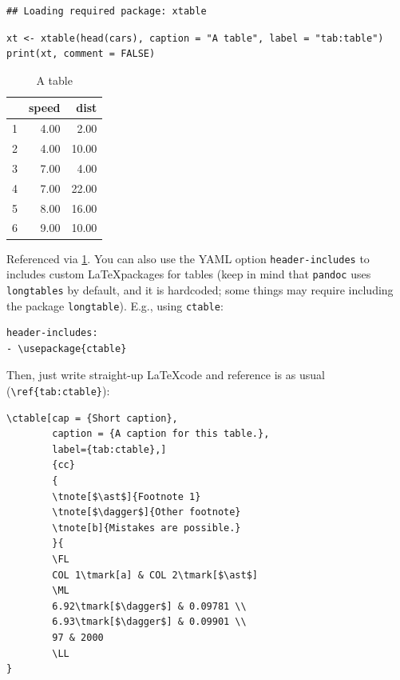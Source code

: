 \documentclass[Royal,times,sageh]{sagej}
\begin{document}
\begin{verbatim}
## Loading required package: xtable
\end{verbatim}

\begin{verbatim}
xt <- xtable(head(cars), caption = "A table", label = "tab:table")
print(xt, comment = FALSE)
\end{verbatim}

\begin{table}[ht]
\centering
\begin{tabular}{rrr}
  \hline
 & speed & dist \\ 
  \hline
1 & 4.00 & 2.00 \\ 
  2 & 4.00 & 10.00 \\ 
  3 & 7.00 & 4.00 \\ 
  4 & 7.00 & 22.00 \\ 
  5 & 8.00 & 16.00 \\ 
  6 & 9.00 & 10.00 \\ 
   \hline
\end{tabular}
\caption{A table} 
\label{tab:table}
\end{table}

Referenced via \ref{tab:table}. You can also use the YAML option
\texttt{header-includes} to includes custom \LaTeX packages for tables
(keep in mind that \texttt{pandoc} uses \texttt{longtables} by default,
and it is hardcoded; some things may require including the package
\texttt{longtable}). E.g., using \texttt{ctable}:

\begin{verbatim}
header-includes:
- \usepackage{ctable}
\end{verbatim}

Then, just write straight-up \LaTeX code and reference is as usual
(\texttt{\textbackslash{}ref\{tab:ctable\}}):

\begin{verbatim}
\ctable[cap = {Short caption},
        caption = {A caption for this table.},
        label={tab:ctable},]
        {cc}
        {
        \tnote[$\ast$]{Footnote 1}
        \tnote[$\dagger$]{Other footnote}
        \tnote[b]{Mistakes are possible.}
        }{
        \FL
        COL 1\tmark[a] & COL 2\tmark[$\ast$]
        \ML
        6.92\tmark[$\dagger$] & 0.09781 \\
        6.93\tmark[$\dagger$] & 0.09901 \\
        97 & 2000
        \LL
}
\end{verbatim}
\end{document}
